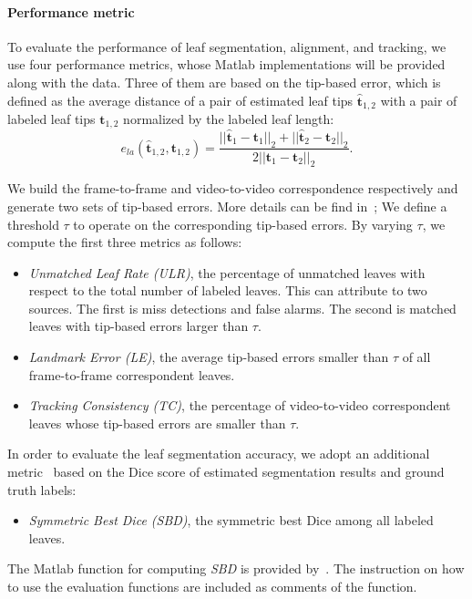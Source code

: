 \paragraph{Performance metric}
To evaluate the performance of leaf segmentation, alignment, and tracking, we use four performance metrics, whose Matlab implementations will be provided along with the data.
Three of them are based on the tip-based error, which is defined as the average distance of a pair of estimated leaf tips $\hat{\bm{t}}_{1,2}$ with a pair of labeled leaf tips $ \bm{t}_{1,2}$ normalized by the labeled leaf length:
\begin {equation}
e_{la}(\hat{\bm{t}}_{1,2}, \bm{t}_{1,2}) = \frac{||\hat{\bm{t}}_1-{\bm{t}}_1||_2 + ||\hat{\bm{t}}_2-{\bm{t}}_2||_2}{2 ||\bm{t}_1-\bm{t}_2||_2}.
\label{eqn:tipError}
\end{equation}

We build the frame-to-frame and video-to-video correspondence respectively and generate two sets of tip-based errors.
More details can be find in~\cite{};
We define a threshold $\tau$ to operate on the corresponding tip-based errors.
By varying $\tau$, we compute the first three metrics as follows:
\begin{itemize}
  \item {\it{Unmatched Leaf Rate (ULR)}}, the percentage of unmatched leaves with respect to the total number of labeled leaves. 
This can attribute to two sources. 
The first is miss detections and false alarms. 
The second is matched leaves with tip-based errors larger than $\tau$.
  \item {\it{Landmark Error (LE)}}, the average tip-based errors smaller than $\tau$ of all frame-to-frame correspondent leaves.
  \item {\it{Tracking Consistency (TC)}}, the percentage of video-to-video correspondent leaves whose tip-based errors are smaller than $\tau$.
\end{itemize}

In order to evaluate the leaf segmentation accuracy, we adopt an additional metric~\cite{scharr2014annotated} based on the Dice score of estimated segmentation results and ground truth labels:
\begin{itemize}
  \item {\it{Symmetric Best Dice (SBD)}}, the symmetric best Dice among all labeled leaves.
\end{itemize}
The Matlab function for computing {\it{SBD}} is provided by~\cite{scharr2014annotated}.
The instruction on how to use the evaluation functions are included as comments of the function.



